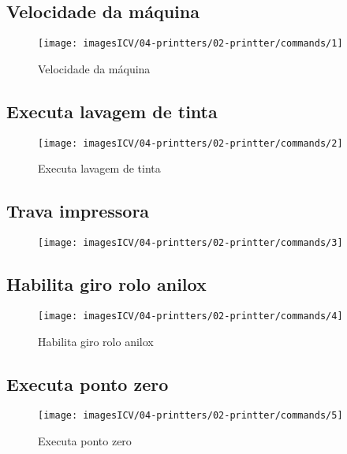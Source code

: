 \usepackage{graphicx}
\newpage
\thispagestyle{fancy}
\vspace{\fill}

\subsection{Velocidade da máquina}
\begin{figure}
    \centering
    \texttt{[image: imagesICV/04-printters/02-printter/commands/1]}
    \caption{Velocidade da máquina}
\end{figure}
\newpage
\thispagestyle{fancy}
\vspace{\fill}

\subsection{Executa lavagem de tinta}
\begin{figure}
    \centering
    \texttt{[image: imagesICV/04-printters/02-printter/commands/2]}
    \caption{Executa lavagem de tinta}
\end{figure}
\newpage
\thispagestyle{fancy}
\vspace{\fill}

\subsection{Trava impressora}
\begin{figure}
    \centering
    \texttt{[image: imagesICV/04-printters/02-printter/commands/3]}
    \caption{\newpage \thispagestyle{fancy} \vspace{\fill}}
\end{figure}
\newpage
\thispagestyle{fancy}
\vspace{\fill}

\subsection{Habilita giro rolo anilox}
\begin{figure}
    \centering
    \texttt{[image: imagesICV/04-printters/02-printter/commands/4]}
    \caption{Habilita giro rolo anilox}
\end{figure}
\newpage
\thispagestyle{fancy}
\vspace{\fill}

\subsection{Executa ponto zero}
\begin{figure}
    \centering
    \texttt{[image: imagesICV/04-printters/02-printter/commands/5]}
    \caption{Executa ponto zero}
\end{figure}
\newpage
\thispagestyle{fancy}
\vspace{\fill}

